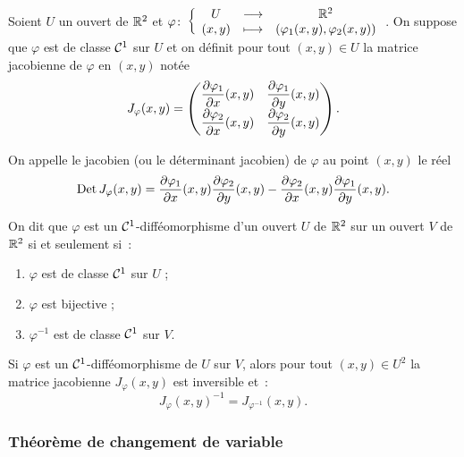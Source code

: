 \begin{defdef}
  Soient \(U\) un ouvert de \(\mathbb{R}^2\) et
  \(\varphi\colon\left\{\begin{array}{ccc}U & \longrightarrow &\mathbb{R}^2\\(x,y) & \longmapsto & (\varphi_1(x,y),\varphi_2(x,y))\end{array}\right.\). On
  suppose que \(\varphi\) est de classe \(\mathcal{C}^{1}\) sur \(U\) et on définit
  pour tout \((x,y) \in U\) la matrice jacobienne de \(\varphi\) en \((x,y)\)
  notée
  \begin{equation}
    J_\varphi(x,y) = \begin{pmatrix} \dfrac{\partial{} \varphi_1}{\partial{} x}(x,y) &
    \dfrac{\partial{} \varphi_1}{\partial{} y}(x,y) \\ \dfrac{\partial{} \varphi_2}{\partial{} x}(x,y) &
    \dfrac{\partial{} \varphi_2}{\partial{} y}(x,y) \end{pmatrix}.
  \end{equation}

  On appelle le jacobien (ou le déterminant jacobien) de \(\varphi\) au point
  \((x,y)\) le réel
  \begin{equation}
    \operatorname{Det} J_\varphi(x,y) = \dfrac{\partial{} \varphi_1}{\partial{} x}(x,y)
    \dfrac{\partial{} \varphi_2}{\partial{} y}(x,y) - \dfrac{\partial{} \varphi_2}{\partial{} x}(x,y)
    \dfrac{\partial{} \varphi_1}{\partial{} y}(x,y).
  \end{equation}
\end{defdef}
%
\begin{defdef}
  On dit que \(\varphi\) est un \(\mathcal{C}^{1}\)-difféomorphisme d'un ouvert \(U\)
  de \(\mathbb{R}^2\) sur un ouvert \(V\) de \(\mathbb{R}^2\) si et seulement si~:
  \begin{enumerate}
    \item \(\varphi\) est de classe \(\mathcal{C}^{1}\) sur \(U\) ;
    \item \(\varphi\) est bijective ;
    \item \(\varphi^{-1}\) est de classe \(\mathcal{C}^{1}\) sur \(V\).
  \end{enumerate}
\end{defdef}
%
\begin{prop}[Admise]
  Si \(\varphi\) est un \(\mathcal{C}^{1}\)-difféomorphisme de \(U\) sur \(V\), alors
  pour tout \((x,y) \in U^2\) la matrice jacobienne \(J_\varphi(x,y)\) est
  inversible et~:
  \begin{equation}
    J_\varphi(x,y)^{-1} = J_{\varphi^{-1}}(x,y).
  \end{equation}
\end{prop}

\subsubsection{Théorème de changement de variable}

